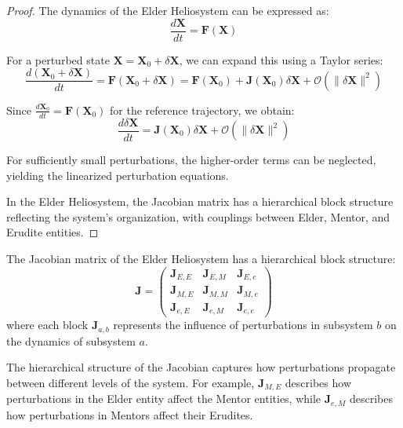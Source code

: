 \begin{proof}
The dynamics of the Elder Heliosystem can be expressed as:
\begin{equation}
\frac{d\mathbf{X}}{dt} = \mathbf{F}(\mathbf{X})
\end{equation}

For a perturbed state $\mathbf{X} = \mathbf{X}_0 + \delta\mathbf{X}$, we can expand this using a Taylor series:
\begin{equation}
\frac{d(\mathbf{X}_0 + \delta\mathbf{X})}{dt} = \mathbf{F}(\mathbf{X}_0 + \delta\mathbf{X}) = \mathbf{F}(\mathbf{X}_0) + \mathbf{J}(\mathbf{X}_0) \delta\mathbf{X} + \mathcal{O}(\|\delta\mathbf{X}\|^2)
\end{equation}

Since $\frac{d\mathbf{X}_0}{dt} = \mathbf{F}(\mathbf{X}_0)$ for the reference trajectory, we obtain:
\begin{equation}
\frac{d\delta\mathbf{X}}{dt} = \mathbf{J}(\mathbf{X}_0) \delta\mathbf{X} + \mathcal{O}(\|\delta\mathbf{X}\|^2)
\end{equation}

For sufficiently small perturbations, the higher-order terms can be neglected, yielding the linearized perturbation equations.

In the Elder Heliosystem, the Jacobian matrix has a hierarchical block structure reflecting the system's organization, with couplings between Elder, Mentor, and Erudite entities.
\end{proof}

\begin{definition}
The Jacobian matrix of the Elder Heliosystem has a hierarchical block structure:
\begin{equation}
\mathbf{J} = 
\begin{pmatrix}
\mathbf{J}_{E,E} & \mathbf{J}_{E,M} & \mathbf{J}_{E,e} \\
\mathbf{J}_{M,E} & \mathbf{J}_{M,M} & \mathbf{J}_{M,e} \\
\mathbf{J}_{e,E} & \mathbf{J}_{e,M} & \mathbf{J}_{e,e}
\end{pmatrix}
\end{equation}
where each block $\mathbf{J}_{a,b}$ represents the influence of perturbations in subsystem $b$ on the dynamics of subsystem $a$.
\end{definition}

The hierarchical structure of the Jacobian captures how perturbations propagate between different levels of the system. For example, $\mathbf{J}_{M,E}$ describes how perturbations in the Elder entity affect the Mentor entities, while $\mathbf{J}_{e,M}$ describes how perturbations in Mentors affect their Erudites.

